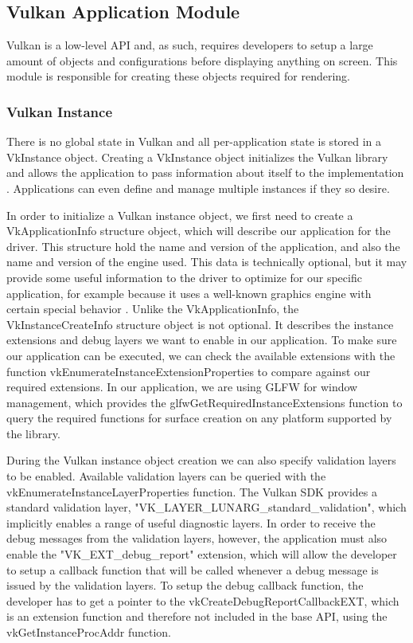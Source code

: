 \subsection{Vulkan Application Module}
Vulkan is a low-level API and, as such, requires developers to setup a large amount of objects and configurations before displaying anything on screen. This module is responsible for creating these objects required for rendering.

\subsubsection{Vulkan Instance}
There is no global state in Vulkan and all per-application state is stored in a VkInstance object. Creating a VkInstance object initializes the Vulkan library and allows the application to pass information about itself to the implementation \cite{vulkan_docs}. Applications can even define and manage multiple instances if they so desire.

In order to initialize a Vulkan instance object, we first need to create a VkApplicationInfo structure object, which will describe our application for the driver. This structure hold the name and version of the application, and also the name and version of the engine used. This data is technically optional, but it may provide some useful information to the driver to optimize for our specific application, for example because it uses a well-known graphics engine with certain special behavior \cite{vulkan_tutorial}. Unlike the VkApplicationInfo, the VkInstanceCreateInfo structure object is not optional. It describes the instance extensions and debug layers we want to enable in our application. To make sure our application can be executed, we can check the available extensions with the function vkEnumerateInstanceExtensionProperties to compare against our required extensions. In our application, we are using GLFW for window management, which provides the glfwGetRequiredInstanceExtensions function \cite{glfw_vulkan} to query the required functions for surface creation on any platform supported by the library.

During the Vulkan instance object creation we can also specify validation layers to be enabled. Available validation layers can be queried with the vkEnumerateInstanceLayerProperties function. The Vulkan SDK provides a standard validation layer, "VK\_LAYER\_LUNARG\_standard\_validation", which implicitly enables a range of useful diagnostic layers. In order to receive the debug messages from the validation layers, however, the application must also enable the "VK\_EXT\_debug\_report" extension, which will allow the developer to setup a callback function that will be called whenever a debug message is issued by the validation layers. To setup the debug callback function, the developer has to get a pointer to the vkCreateDebugReportCallbackEXT, which is an extension function and therefore not included in the base API, using the vkGetInstanceProcAddr function.

